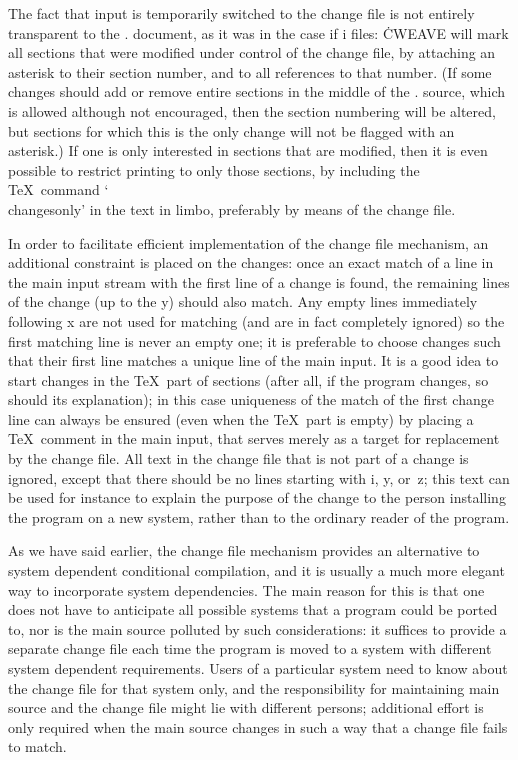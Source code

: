 The fact that input is temporarily switched to the change file is not
entirely transparent to the \CWEB. document, as it was in the case if \:i
files: \.{CWEAVE} will mark all sections that were modified under control of
the change file, by attaching an asterisk to their section number, and to all
references to that number. (If some changes should add or remove entire
sections in the middle of the \CWEB. source, which is allowed although not
encouraged, then the section numbering will be altered, but sections for
which this is the only change will not be flagged with an asterisk.) If one
is only interested in sections that are modified, then it is even possible
to restrict printing to only those sections, by including the \TeX~command
`\.{\\changesonly}' in the text in limbo, preferably by means of the change
file.

In order to facilitate efficient implementation of the change file
mechanism, an additional constraint is placed on the changes: once an exact
match of a line in the main input stream with the first line of a change is
found, the remaining lines of the change (up to the \:y) should also match.
Any empty lines immediately following \:x are not used for matching (and are
in fact completely ignored) so the first matching line is never an empty
one; it is preferable to choose changes such that their first line matches a
unique line of the main input.  It is a good idea to start changes in the
\TeX~part of sections (after all, if the program changes, so should its
explanation); in this case uniqueness of the match of the first change line
can always be ensured (even when the \TeX~part is empty) by placing a
\TeX~comment in the main input, that serves merely as a target for
replacement by the change file.  All text in the change file that is not
part of a change is ignored, except that there should be no lines starting
with \:i, \:y, or~\:z; this text can be used for instance to explain the
purpose of the change to the person installing the program on a new system,
rather than to the ordinary reader of the program.

As we have said earlier, the change file mechanism provides an alternative
to system dependent conditional compilation, and it is usually a much more
elegant way to incorporate system dependencies. The main reason for this is
that one does not have to anticipate all possible systems that a program
could be ported to, nor is the main source polluted by such considerations:
it suffices to provide a separate change file each time the program is moved
to a system with different system dependent requirements. Users of a
particular system need to know about the change file for that system only,
and the responsibility for maintaining main source and the change file might
lie with different persons; additional effort is only required when the main
source changes in such a way that a change file fails to match.

